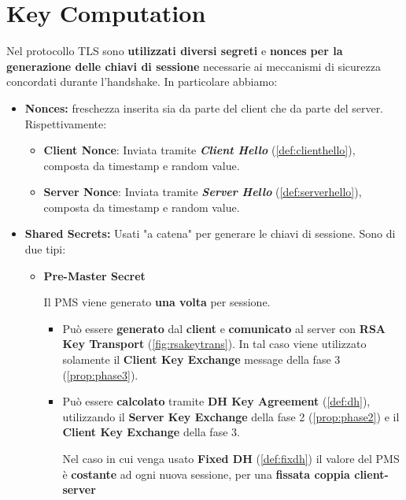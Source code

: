 \section{Key Computation}
Nel protocollo TLS sono \textbf{utilizzati diversi segreti} e \textbf{nonces} \textbf{per la generazione delle chiavi di sessione }necessarie ai meccanismi di sicurezza concordati durante l’handshake. In particolare abbiamo:
\begin{itemize}
    \item \textbf{Nonces:} freschezza inserita sia da parte del client che da parte del server. Rispettivamente:
    \begin{itemize}
        \item \textbf{Client Nonce}: Inviata tramite \textbf{\textit{Client Hello}} (\cref{def:clienthello}), composta da timestamp e random value.
        \item \textbf{Server Nonce}: Inviata tramite \textbf{\textit{Server Hello}} (\cref{def:serverhello}), composta da timestamp e random value.
    \end{itemize}
    \item \textbf{Shared Secrets:} Usati "a catena" per generare le chiavi di sessione. Sono di due tipi:
    \begin{itemize}
        \item \textbf{Pre-Master Secret}
        \begin{definition}\label{def:pms}
        Il PMS viene generato \textbf{una volta} per sessione. 
        \begin{itemize}
            \item Può essere \textbf{generato} dal \textbf{client} e \textbf{comunicato} al server con \textbf{RSA Key Transport} (\cref{fig:rsakeytrans}). In tal caso viene utilizzato solamente il \textbf{Client Key Exchange} message della fase 3 (\cref{prop:phase3}).
            \item Può essere \textbf{calcolato} tramite \textbf{DH Key Agreement} (\cref{def:dh}), utilizzando il \textbf{Server Key Exchange} della fase 2 (\cref{prop:phase2}) e il \textbf{Client Key Exchange} della fase 3.\\
            \begin{remark}
            Nel caso in cui venga usato \textbf{Fixed DH} (\cref{def:fixdh}) il valore del PMS è \textbf{costante} ad ogni nuova sessione, per una \textbf{fissata coppia client-server}
            \end{remark}
        \end{itemize}

\end{definition}
\end{itemize}
\end{itemize}
